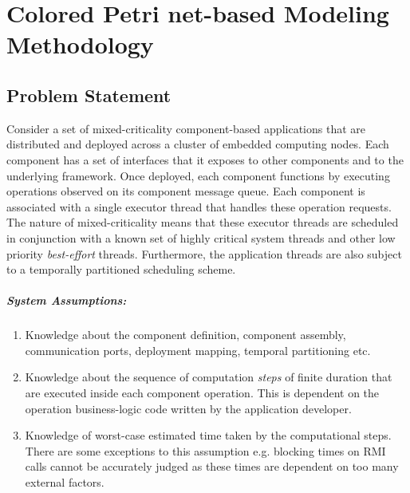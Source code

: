 \chapter{Colored Petri net-based Modeling Methodology}
\label{chapter:modeling}

\section{Problem Statement}

Consider a set of mixed-criticality component-based applications that are distributed and deployed across a cluster of embedded computing nodes. Each component has a set of interfaces that it exposes to other components and to the underlying framework. Once deployed, each component functions by executing operations observed on its component message queue. Each component is associated with a single executor thread that handles these operation requests. The nature of mixed-criticality means that these executor threads are scheduled in conjunction with a known set of highly critical system threads and other low priority \emph{best-effort} threads. Furthermore, the application threads are also subject to a temporally partitioned scheduling scheme. 

\paragraph{System Assumptions: }
\begin{enumerate}
	\item Knowledge about the component definition, component assembly, communication ports, deployment mapping, temporal partitioning etc. 
	
	\item Knowledge about the sequence of computation \emph{steps} of finite duration that are executed inside each component operation. This is dependent on the operation business-logic code written by the application developer.
	
	\item Knowledge of worst-case estimated time taken by the computational steps. There are some exceptions to this assumption e.g. blocking times on RMI calls cannot be accurately judged as these times are dependent on too many external factors.
\end{enumerate}


